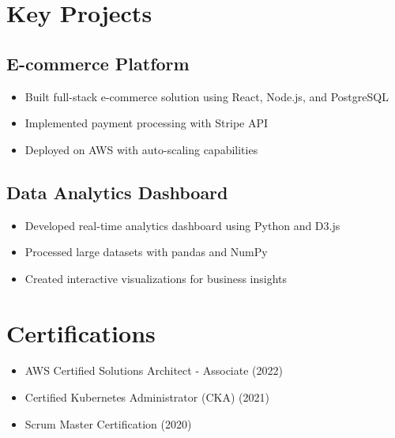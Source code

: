 \documentclass[11pt,a4paper]{article}
\begin{document}
\vspace{0.3cm}

\section*{Key Projects}

\subsection*{E-commerce Platform}
\begin{itemize}[noitemsep]
    \item Built full-stack e-commerce solution using React, Node.js, and PostgreSQL
    \item Implemented payment processing with Stripe API
    \item Deployed on AWS with auto-scaling capabilities
\end{itemize}

\vspace{0.2cm}

\subsection*{Data Analytics Dashboard}
\begin{itemize}[noitemsep]
    \item Developed real-time analytics dashboard using Python and D3.js
    \item Processed large datasets with pandas and NumPy
    \item Created interactive visualizations for business insights
\end{itemize}

\vspace{0.3cm}

\section*{Certifications}
\begin{itemize}[noitemsep]
    \item AWS Certified Solutions Architect - Associate (2022)
    \item Certified Kubernetes Administrator (CKA) (2021)
    \item Scrum Master Certification (2020)
\end{itemize}
\end{document}
